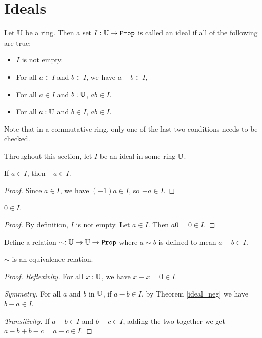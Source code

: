\documentclass[../../math.tex]{subfiles}
\begin{document}
\section{Ideals}

\begin{definition}
    Let $\mathbb{U}$ be a ring.  Then a set $I : \U \to \Prop$ is called an ideal if all
    of the following are true:
    \begin{itemize}
        \item $I$ is not empty.
        \item For all $a \in I$ and $b \in I$, we have $a + b \in I$,
        \item For all $a \in I$ and $b : \mathbb{U}$, $ab \in I$.
        \item For all $a : \mathbb{U}$ and $b \in I$, $ab \in I$.
    \end{itemize}
    Note that in a commutative ring, only one of the last two conditions needs
    to be checked.
\end{definition}

Throughout this section, let $I$ be an ideal in some ring $\mathbb{U}$.

\begin{theorem} \label{ideal_neg}
    If $a \in I$, then $-a \in I$.
\end{theorem}
\begin{proof}
    Since $a \in I$, we have $(-1)a \in I$, so $-a \in I$.
\end{proof}

\begin{theorem} \label{ideal_zero}
    $0 \in I$.
\end{theorem}
\begin{proof}
    By definition, $I$ is not empty.  Let $a \in I$.  Then $a0 = 0 \in I$.
\end{proof}

\begin{definition}
    Define a relation $\sim : \U \to \U \to \Prop$ where $a \sim b$ is defined
    to mean $a - b \in I$.
\end{definition}

\begin{lemma}
    $\sim$ is an equivalence relation.
\end{lemma}
\begin{proof}
    \textit{Reflexivity.} For all $x : \mathbb{U}$, we have $x - x = 0 \in I$.

    \textit{Symmetry.} For all $a$ and $b$ in $\mathbb{U}$, if $a - b \in I$, by Theorem
    \ref{ideal_neg} we have $b - a \in I$.

    \textit{Transitivity.}  If $a - b \in I$ and $b - c \in I$, adding the two
    together we get $a - b + b - c = a - c \in I$.
\end{proof}
\end{document}
